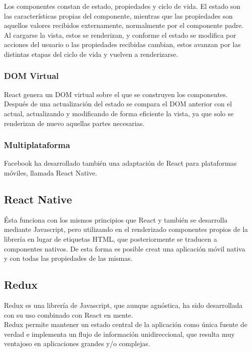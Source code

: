 Los componentes constan de estado, propiedades y ciclo de vida. El estado son las características propias del componente, mientras que las propiedades son aquellos valores recibidos externamente, normalmente por el componente padre. Al cargarse la vista, estos se renderizan, y conforme el estado se modifica por acciones del usuario o las propiedades recibidas cambian, estos avanzan por las distintas etapas del ciclo de vida y vuelven a renderizarse. \\

\subsubsection {DOM Virtual}

React genera un DOM virtual sobre el que se construyen los componentes. Después de una actualización del estado se compara el DOM anterior con el actual, actualizando y modificando de forma eficiente la vista, ya que solo se renderizan de nuevo aquellas partes necesarias.  \\

\subsubsection {Multiplataforma}

Facebook ha desarrollado también una adaptación de React para plataformas móviles, llamada React Native.

\subsection {React Native} 

Ésta funciona con los mismos principios que React y también se desarrolla mediante Javascript, pero utilizando en el renderizado componentes propios de la librería en lugar de etiquetas HTML, que posteriormente se traducen a componentes nativos. De esta forma es posible creat una aplicación móvil nativa y con todas las propiedades de las mismas. \\

\subsection {Redux}

Redux es una librería de Javascript, que aunque agnóstica, ha sido desarrollada con su uso combinado con React en mente. \\ 

Redux permite mantener un estado central de la aplicación como única fuente de verdad e implementa un flujo de información unidireccional, que resulta muy ventajoso en aplicaciones grandes y/o complejas. \\

